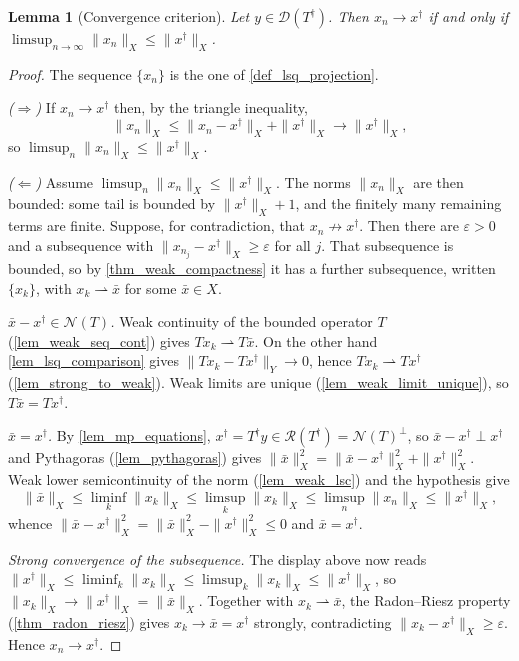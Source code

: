\documentclass[a4paper]{report}
\theoremstyle{plain}
\newtheorem{lemma}[theorem]{Lemma}
\theoremstyle{definition}
\theoremstyle{remark}
\newcommand{\Ran}{\mathcal{R}}
\newcommand{\Ker}{\mathcal{N}}
\newcommand{\Dom}{\mathcal{D}}
\newcommand{\dg}{^{\dagger}}
\newcommand{\wc}{\rightharpoonup}
\begin{document}
\begin{lemma}[Convergence criterion]
  \label{lem_lsq_convergence_criterion}
  Let $y \in \Dom(T\dg)$.  Then $x_n \to x\dg$ if and only if
  $\limsup_{n \to \infty}\|x_n\|_X \le \|x\dg\|_X$.
\end{lemma}

\begin{proof}
  The sequence $\{x_n\}$ is the one of \cref{def_lsq_projection}.

  \emph{($\Rightarrow$)}  If $x_n \to x\dg$ then, by the triangle inequality,
  \[
    \|x_n\|_X \le \|x_n - x\dg\|_X + \|x\dg\|_X \longrightarrow \|x\dg\|_X ,
  \]
  so $\limsup_n\|x_n\|_X \le \|x\dg\|_X$.

  \emph{($\Leftarrow$)}  Assume $\limsup_n\|x_n\|_X \le \|x\dg\|_X$.  The norms
  $\|x_n\|_X$ are then bounded: some tail is bounded by $\|x\dg\|_X + 1$, and the
  finitely many remaining terms are finite.  Suppose, for contradiction, that
  $x_n \not\to x\dg$.  Then there are $\varepsilon > 0$ and a subsequence with
  $\|x_{n_j} - x\dg\|_X \ge \varepsilon$ for all $j$.  That subsequence is bounded, so
  by \cref{thm_weak_compactness} it has a further subsequence, written $\{x_k\}$, with
  $x_k \wc \bar{x}$ for some $\bar{x} \in X$.

  \emph{$\bar{x} - x\dg \in \Ker(T)$.}  Weak continuity of the bounded operator $T$
  (\cref{lem_weak_seq_cont}) gives $Tx_k \wc T\bar{x}$.  On the other hand
  \cref{lem_lsq_comparison} gives $\|Tx_k - Tx\dg\|_Y \to 0$, hence $Tx_k \wc Tx\dg$
  (\cref{lem_strong_to_weak}).  Weak limits are unique (\cref{lem_weak_limit_unique}), so
  $T\bar{x} = Tx\dg$.

  \emph{$\bar{x} = x\dg$.}  By \cref{lem_mp_equations}, $x\dg = T\dg y \in \Ran(T\dg) =
  \Ker(T)^{\perp}$, so $\bar{x} - x\dg \perp x\dg$ and Pythagoras (\cref{lem_pythagoras})
  gives $\|\bar{x}\|_X^{2} = \|\bar{x} - x\dg\|_X^{2} + \|x\dg\|_X^{2}$.  Weak lower
  semicontinuity of the norm (\cref{lem_weak_lsc}) and the hypothesis give
  \[
    \|\bar{x}\|_X \le \liminf_{k}\|x_k\|_X \le \limsup_{k}\|x_k\|_X
      \le \limsup_{n}\|x_n\|_X \le \|x\dg\|_X ,
  \]
  whence $\|\bar{x} - x\dg\|_X^{2} = \|\bar{x}\|_X^{2} - \|x\dg\|_X^{2} \le 0$ and
  $\bar{x} = x\dg$.

  \emph{Strong convergence of the subsequence.}  The display above now reads
  $\|x\dg\|_X \le \liminf_k\|x_k\|_X \le \limsup_k\|x_k\|_X \le \|x\dg\|_X$, so
  $\|x_k\|_X \to \|x\dg\|_X = \|\bar{x}\|_X$.  Together with $x_k \wc \bar{x}$, the
  Radon--Riesz property (\cref{thm_radon_riesz}) gives $x_k \to \bar{x} = x\dg$ strongly,
  contradicting $\|x_k - x\dg\|_X \ge \varepsilon$.  Hence $x_n \to x\dg$.
\end{proof}
\end{document}
